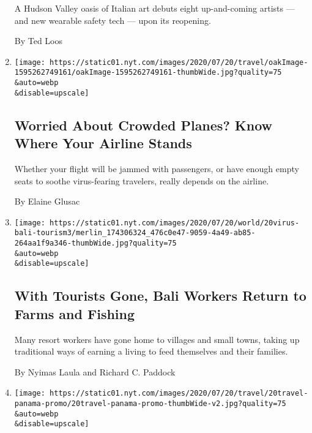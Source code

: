 \begin{enumerate}
  A Hudson Valley oasis of Italian art debuts eight up-and-coming
  artists --- and new wearable safety tech --- upon its reopening.

  By Ted Loos
\item
  \href{/2020/07/21/travel/crowded-flights-coronavirus.html}{}

  \texttt{[image: https://static01.nyt.com/images/2020/07/20/travel/oakImage-1595262749161/oakImage-1595262749161-thumbWide.jpg?quality=75\\\&auto=webp\\\&disable=upscale]}

  \hypertarget{worried-about-crowded-planes-know-where-your-airline-stands}{%
  \subsection{Worried About Crowded Planes? Know Where Your Airline
  Stands}\label{worried-about-crowded-planes-know-where-your-airline-stands}}

  Whether your flight will be jammed with passengers, or have enough
  empty seats to soothe virus-fearing travelers, really depends on the
  airline.

  By Elaine Glusac
\item
  \href{/2020/07/20/world/asia/bali-tourism-coronavirus.html}{}

  \texttt{[image: https://static01.nyt.com/images/2020/07/20/world/20virus-bali-tourism3/merlin\_174306324\_476c0e47-9059-4a49-ab85-264aa1f9a346-thumbWide.jpg?quality=75\\\&auto=webp\\\&disable=upscale]}

  \hypertarget{with-tourists-gone-bali-workers-return-to-farms-and-fishing}{%
  \subsection{With Tourists Gone, Bali Workers Return to Farms and
  Fishing}\label{with-tourists-gone-bali-workers-return-to-farms-and-fishing}}

  Many resort workers have gone home to villages and small towns, taking
  up traditional ways of earning a living to feed themselves and their
  families.

  By Nyimas Laula and Richard C. Paddock
\item
  \href{/2020/07/20/travel/panama-hats-ecuador.html}{}

  \texttt{[image: https://static01.nyt.com/images/2020/07/20/travel/20travel-panama-promo/20travel-panama-promo-thumbWide-v2.jpg?quality=75\\\&auto=webp\\\&disable=upscale]}

  \hypertarget{the-world-through-a-lens-1}{%
}
\end{enumerate}
